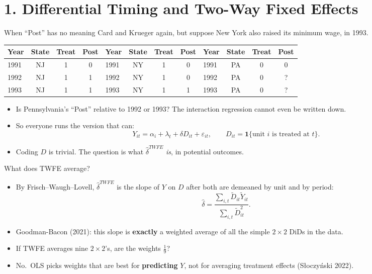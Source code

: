 \documentclass[
  11pt,
  ignorenonframetext,
  aspectratio=169,
]{beamer}
\providecommand{\tightlist}{%
  \setlength{\itemsep}{0pt}\setlength{\parskip}{0pt}}
\begin{document}
\section{1. Differential Timing and Two-Way Fixed
Effects}\label{differential-timing-and-two-way-fixed-effects}

\begin{frame}{When ``Post'' has no meaning}
\protect{}\label{when-post-has-no-meaning}
Card and Krueger again, but suppose New York also raised its minimum
wage, in 1993.

\begin{center}\scriptsize
\begin{tabular}{lccc|lccc|lccc}
\toprule
Year & State & Treat & Post & Year & State & Treat & Post & Year & State & Treat & Post \\
\midrule
1991 & NJ & 1 & 0 & 1991 & NY & 1 & 0 & 1991 & PA & 0 & 0 \\
1992 & NJ & 1 & 1 & 1992 & NY & 1 & 0 & 1992 & PA & 0 & ? \\
1993 & NJ & 1 & 1 & 1993 & NY & 1 & 1 & 1993 & PA & 0 & ? \\
\bottomrule
\end{tabular}
\end{center}

\begin{itemize}
\tightlist
\item
  Is Pennsylvania's ``Post'' relative to 1992 or 1993? The interaction
  regression cannot even be written down.
\item
  So everyone runs the version that can: \[
  Y_{it} = \alpha_i + \lambda_t + \delta D_{it} + \varepsilon_{it}, \qquad D_{it} = \mathbf{1}\{\text{unit } i \text{ is treated at } t\}.
  \]
\item
  Coding \(D\) is trivial. The question is what \(\hat\delta^{TWFE}\)
  \emph{is}, in potential outcomes.
\end{itemize}
\end{frame}

\begin{frame}{What does TWFE average?}
\protect{}\label{what-does-twfe-average}
\begin{itemize}
\tightlist
\item
  By Frisch--Waugh--Lovell, \(\hat\delta^{TWFE}\) is the slope of \(Y\)
  on \(D\) after both are demeaned by unit and by period: \[
  \hat\delta = \frac{\sum_{i,t} \tilde D_{it}\tilde Y_{it}}{\sum_{i,t} \tilde D_{it}^2}.
  \]
\item
  Goodman-Bacon (2021): this slope is \textbf{exactly} a weighted
  average of all the simple \(2 \times 2\) DiDs in the data.
\item
  If TWFE averages nine \(2 \times 2\)'s, are the weights \(\tfrac19\)?
\item
  No.~OLS picks weights that are best for \textbf{predicting} \(Y\), not
  for averaging treatment effects (Słoczyński 2022).
\end{itemize}
\end{frame}
\end{document}

